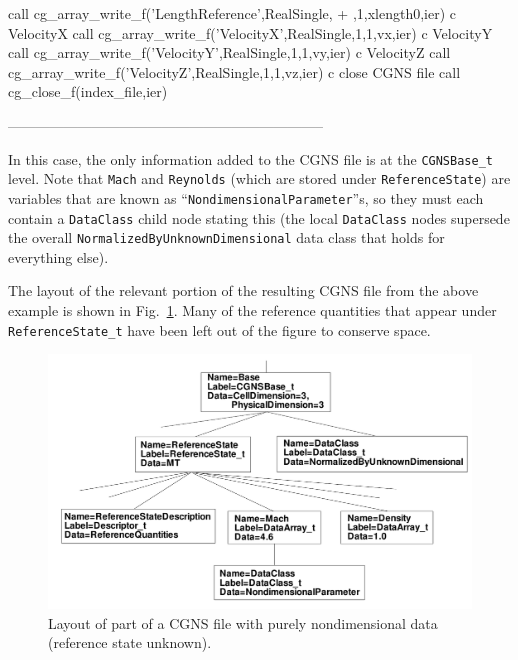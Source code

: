 \documentclass[12pt]{article}
\begin{document}
{\newline\indent      call cg\_array\_write\_f('LengthReference',RealSingle,
\newline + ,1,xlength0,ier)
\newline c   VelocityX
\newline\indent      call cg\_array\_write\_f('VelocityX',RealSingle,1,1,vx,ier)
\newline c   VelocityY
\newline\indent      call cg\_array\_write\_f('VelocityY',RealSingle,1,1,vy,ier)
\newline c   VelocityZ
\newline\indent      call cg\_array\_write\_f('VelocityZ',RealSingle,1,1,vz,ier)
\newline c   close CGNS file
\newline\indent      call cg\_close\_f(index\_file,ier)
}

--------------------------------------------------------------------

In this case, the only information
added to the CGNS file is at the {\tt CGNSBase\_t} level.
Note that {\tt Mach} and {\tt Reynolds} (which are stored under
{\tt ReferenceState}) are variables that are
known as ``{\tt NondimensionalParameter}''s, so they must
each contain a {\tt DataClass} child node stating this
(the local {\tt DataClass} nodes supersede the overall
{\tt NormalizedByUnknownDimensional} data class that holds for everything else).

The layout of the relevant portion of the resulting CGNS file
from the above example is shown in Fig.~\ref{FIGtree_nondimensional}.
Many of the reference quantities that appear under
{\tt ReferenceState\_t} have been left out of the figure
to conserve space.

\begin{figure}[hpbt]
\centerline{{\includegraphics[width=150mm]{figures/tree_nondimensional}}}
\caption{Layout of part of a CGNS file with
purely nondimensional data (reference state unknown).}
\label{FIGtree_nondimensional}
\end{figure}
%
\end{document}
